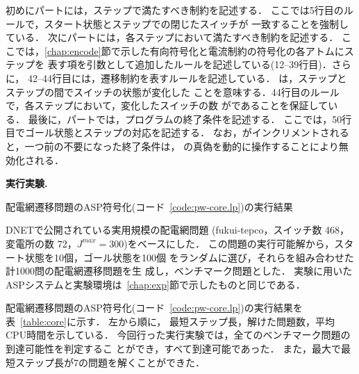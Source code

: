 初めにパートには，ステップで満たすべき制約を記述する．
ここでは5行目のルールで，スタート状態とステップでの閉じたスイッチが
一致することを強制している．
%
次にパートには，各ステップにおいて満たすべき制約を記述する．
ここでは，\ref{chap:encode}節で示した有向符号化と電流制約の符号化の各アトムにステップを
表す項を引数として追加したルールを記述している(12--39行目)．さらに，
42--44行目には，遷移制約を表すルールを記述している．
は，ステップとステップの間でスイッチの状態が変化した
ことを意味する．44行目のルールで，各ステップにおいて，変化したスイッチの数
がであることを保証している．
%
最後に，パートでは，プログラムの終了条件を記述する．
ここでは，50行目でゴール状態とステップの対応を記述する．
なお，がインクリメントされると，一つ前の不要になった終了条件は，
の真偽を動的に操作することにより無効化される．

\textbf{実行実験.}
\begin{table*}[t]
  \centering
  \caption{配電網遷移問題のASP符号化(コード~\ref{code:pw-core.lp})の実行結果}
  \label{table:core}
  
\end{table*}
%
DNETで公開されている実用規模の配電網問題
({\sf fukui-tepco}，スイッチ数 468，変電所の数 72，$J^{max}=300$)をベースにした．
この問題の実行可能解から，スタート状態を10個，ゴール状態を100個
をランダムに選び，それらを組み合わせた計1000問の配電網遷移問題を生
成し，ベンチマーク問題とした．
実験に用いたASPシステムと実験環境は~\ref{chap:exp}節で示したものと同じである．

配電網遷移問題のASP符号化(コード~\ref{code:pw-core.lp})の実行結果を
表~\ref{table:core}に示す．
左から順に，
最短ステップ長，解けた問題数，平均CPU時間を示している．
今回行った実行実験では，全てのベンチマーク問題の到達可能性を判定するこ
とができ，すべて到達可能であった．
また，最大で最短ステップ長が7の問題を解くことができた．


